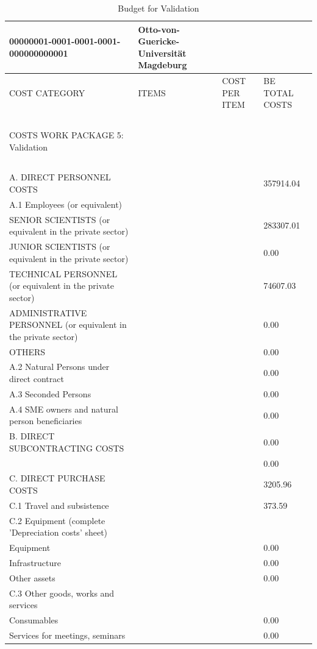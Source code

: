 \begin{table}[H]
\centering
\caption{Budget for Validation}
\begin{tabular}{|l|l|l|l|}
\hline
00000001-0001-0001-0001-000000000001 & Otto-von-Guericke-Universität Magdeburg & ~ & ~ \\ \hline
COST CATEGORY & ITEMS & COST PER ITEM & BE TOTAL COSTS \\ \hline
~ & ~ & ~ & ~ \\ \hline
COSTS WORK PACKAGE 5: Validation & ~ & ~ & ~ \\ \hline
~ & ~ & ~ & ~ \\ \hline
A. DIRECT PERSONNEL COSTS & ~ & ~ & 357914.04 \\ \hline
A.1 Employees (or equivalent) & ~ & ~ & ~ \\ \hline
SENIOR SCIENTISTS (or equivalent in the private sector) & ~ & ~ & 283307.01 \\ \hline
JUNIOR SCIENTISTS (or equivalent in the private sector) & ~ & ~ & 0.00 \\ \hline
TECHNICAL PERSONNEL (or equivalent in the private sector) & ~ & ~ & 74607.03 \\ \hline
ADMINISTRATIVE PERSONNEL (or equivalent in the private sector) & ~ & ~ & 0.00 \\ \hline
OTHERS & ~ & ~ & 0.00 \\ \hline
A.2 Natural Persons under direct contract & ~ & ~ & 0.00 \\ \hline
A.3 Seconded Persons & ~ & ~ & 0.00 \\ \hline
A.4 SME owners and natural person beneficiaries & ~ &  & 0.00 \\ \hline
B. DIRECT SUBCONTRACTING COSTS & ~ & ~ & 0.00\\ \hline
~ & ~ & ~ & 0.00 \\ \hline
C. DIRECT PURCHASE COSTS & ~ & ~ & 3205.96 \\ \hline
C.1 Travel and subsistence & ~ &  & 373.59 \\ \hline
C.2 Equipment (complete 'Depreciation costs' sheet) & ~ & ~ & ~ \\ \hline
Equipment & ~ &  & 0.00 \\ \hline
Infrastructure & ~ &  & 0.00 \\ \hline
Other assets & ~ &  & 0.00 \\ \hline
C.3 Other goods, works and services & ~ & ~ & ~ \\ \hline
Consumables & ~ &  & 0.00 \\ \hline
Services for meetings, seminars & ~ & ~ & 0.00 \\ \hline

\end{tabular}
\end{table}
